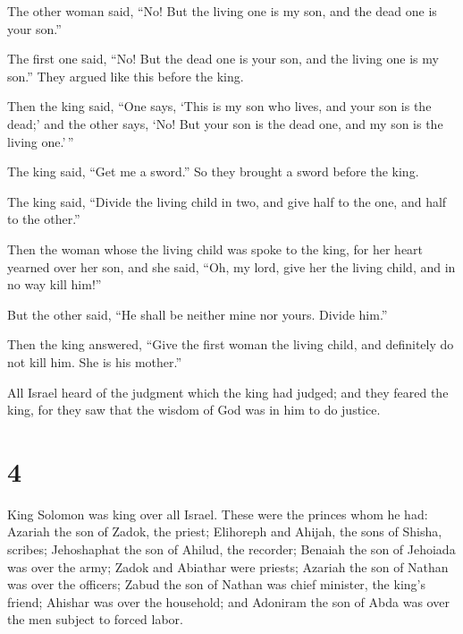  The other woman said, ``No! But the living one is my son,
and the dead one is your son.''

The first one said, ``No! But the dead one is your son, and the living
one is my son.'' They argued like this before the king.

 Then the king said, ``One says, `This is my son who lives,
and your son is the dead;' and the other says, `No! But your son is the
dead one, and my son is the living one.'\,''

 The king said, ``Get me a sword.'' So they brought a sword
before the king.

 The king said, ``Divide the living child in two, and give
half to the one, and half to the other.''

 Then the woman whose the living child was spoke to the
king, for her heart yearned over her son, and she said, ``Oh, my lord,
give her the living child, and in no way kill him!''

But the other said, ``He shall be neither mine nor yours. Divide him.''

 Then the king answered, ``Give the first woman the living
child, and definitely do not kill him. She is his mother.''

 All Israel heard of the judgment which the king had
judged; and they feared the king, for they saw that the wisdom of God
was in him to do justice.

\hypertarget{section-3}{%
\section{4}\label{section-3}}

 King Solomon was king over all Israel.  These
were the princes whom he had: Azariah the son of Zadok, the priest;
 Elihoreph and Ahijah, the sons of Shisha, scribes;
Jehoshaphat the son of Ahilud, the recorder;  Benaiah the
son of Jehoiada was over the army; Zadok and Abiathar were priests;
 Azariah the son of Nathan was over the officers; Zabud the
son of Nathan was chief minister, the king's friend; 
Ahishar was over the household; and Adoniram the son of Abda was over
the men subject to forced labor.

